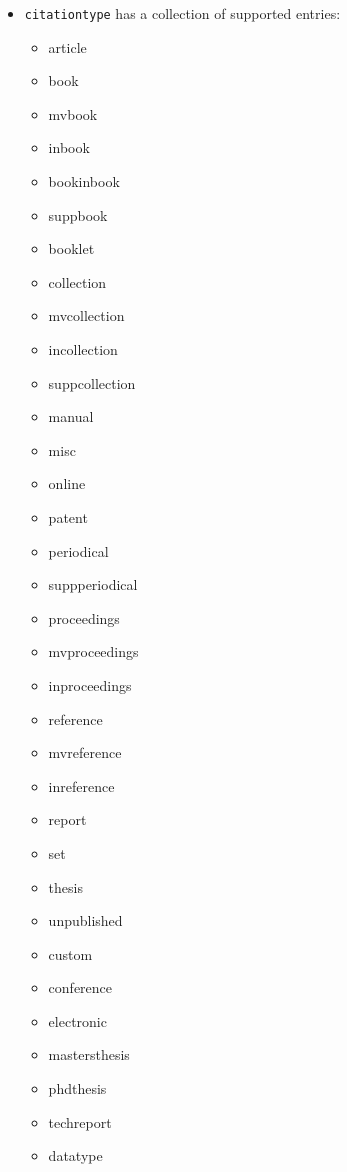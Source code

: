 \documentclass{article}
\begin{document}
\begin{itemize}
    \item \texttt{citationtype} has a collection of supported entries:
    \begin{multicols}{4}
    \begin{itemize} \tt
        \item article
        \item book
        \item mvbook
        \item inbook
        \item bookinbook
        \item suppbook
        \item booklet
        \item collection
        \item mvcollection
        \item incollection
        \item suppcollection
        \item manual
        \item misc
        \item online
        \item patent
        \item periodical
        \item suppperiodical
        \item proceedings
        \item mvproceedings
        \item inproceedings
        \item reference
        \item mvreference
        \item inreference
        \item report
        \item set
        \item thesis
        \item unpublished
        \item custom
        \item conference
        \item electronic
        \item mastersthesis
        \item phdthesis
        \item techreport
        \item datatype
    \end{itemize}
    \end{multicols}

\end{itemize}
\end{document}
